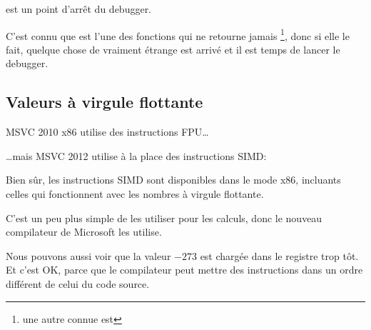  est un point d'arrêt du debugger.

C'est connu que  est l'une des fonctions qui ne retourne jamais
\footnote{une autre connue est },
donc si elle le fait, quelque chose de vraiment étrange est arrivé et il est temps de lancer le debugger.

\subsection{Valeurs à virgule flottante}



MSVC 2010 x86 utilise des instructions \ac{FPU}\dots



\dots mais MSVC 2012 utilise à la place des instructions \ac{SIMD}:



Bien sûr, les instructions \ac{SIMD} sont disponibles dans le mode x86,
incluants celles qui fonctionnent avec les nombres à virgule flottante.

C'est un peu plus simple de les utiliser pour les calculs, donc le nouveau compilateur de Microsoft les utilise.

Nous pouvons aussi voir que la valeur $-273$
est chargée dans le registre  trop tôt.
Et c'est OK, parce que le compilateur peut mettre des instructions dans un ordre
différent de celui du code source.
